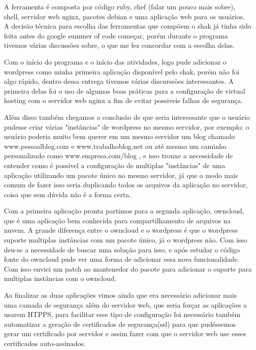 A ferramenta é composta por código ruby, chef (falar um pouco mais sobre), shell,
servidor web nginx, pacotes debian e uma aplicação web para os usuários. A decisão
técnica para escolha das ferramentas que compõem o shak já tinha sido feita antes do google summer of
code começar, porém durante o programa tivemos várias discussões sobre, o que me
fez concordar com a escolha delas.

Com o início do programa e o início das atividades, logo pude adicionar o wordpress
como minha primeira aplicação disponível pelo shak, porém não foi algo rápido, dentro
dessa entrega tivemos várias discurssões interessantes. A primeira delas foi
o uso de algumas boas práticas para a configuração de virtual hosting com  o
servidor web nginx a fim de evitar possiveis falhas de segurança.

Além disso também chegamos a conclusão de que seria interessante que o usuário pudesse
criar várias "instâncias" de wordpress no mesmo servidor, por exemplo: o usuário
poderia muito bem querer em um mesmo servidor um blog chamado www.pessoalblog.com
e www.trabalhoblog.net ou até mesmo um caminho personalizado como www.empresa.com/blog
, e isso trouxe a necessidade de entender como é possível
a configuração de multiplas "instâncias" de uma aplicação utilizando um pacote
único no mesmo servidor, já que o modo mais comum de fazer isso seria duplicando
 todos os arquivos da aplicação no servidor, coisa que sem dúvida não é a forma certa.

Com a primeira aplicação pronta partimos para a segunda aplicação, owncloud, que
é uma aplicação bem conhecida para compartilhamento de arquivos na nuvem. A grande
diferença entre o owncloud e o wordpress é que o wordpress suporte multiplas
instâncias com um pacote único, já o wordpress não. Com isso deu-se a necessidade de
buscar uma solução para isso, e após estudar o código fonte do owncloud pude
ver uma forma de adicionar essa nova funcionalidade. Com isso enviei um
patch ao mantenedor do pacote para adicionar o suporte para multiplas instâncias
com o owncloud.

Ao finalizar as duas aplicações vimos ainda que era necessário adicionar mais
uma camada de segurança além do servidor web, que seria forçar as aplicações
a usarem HTPPS, para facilitar esse tipo de configuração foi necessário também
automatizar a geração de certificados de segurança(ssl) para que pudéssemos gerar
um certificado por servidor e assim fazer com que o servidor web use esses certificados
auto-assinados.

